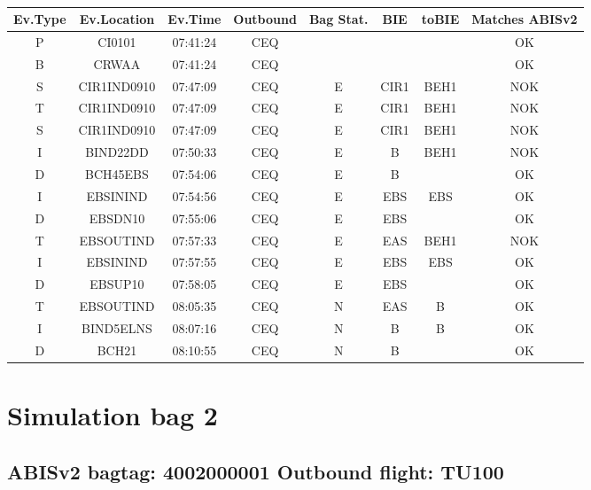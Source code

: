 \documentclass{report}
\begin{document}
\paragraph{}
\begin{longtable}{cccccccc}    \toprule
\rowcolor{white!50}
\textbf{Ev.Type} & \textbf{Ev.Location} & \textbf{Ev.Time} & \textbf{Outbound} & \textbf{Bag Stat.} & \textbf{BIE} & \textbf{toBIE} & \textbf{Matches ABISv2} \\\midrule
P & CI0101 & 07:41:24  & CEQ &  &  &  & OK\\
B & CRWAA & 07:41:24  & CEQ &  &  &  & OK\\
S & CIR1IND0910 & 07:47:09  & CEQ & E & CIR1 & BEH1 & NOK\\
T & CIR1IND0910 & 07:47:09  & CEQ & E & CIR1 & BEH1 & NOK\\
S & CIR1IND0910 & 07:47:09  & CEQ & E & CIR1 & BEH1 & NOK\\
I & BIND22DD & 07:50:33  & CEQ & E & B & BEH1 & NOK\\
D & BCH45EBS & 07:54:06  & CEQ & E & B &  & OK\\
I & EBSININD & 07:54:56  & CEQ & E & EBS & EBS & OK\\
D & EBSDN10 & 07:55:06  & CEQ & E & EBS &  & OK\\
T & EBSOUTIND & 07:57:33  & CEQ & E & EAS & BEH1 & NOK\\
I & EBSININD & 07:57:55  & CEQ & E & EBS & EBS & OK\\
D & EBSUP10 & 07:58:05  & CEQ & E & EBS &  & OK\\
T & EBSOUTIND & 08:05:35  & CEQ & N & EAS & B & OK\\
I & BIND5ELNS & 08:07:16  & CEQ & N & B & B & OK\\
D & BCH21 & 08:10:55  & CEQ & N & B &  & OK\\
\bottomrule
\end{longtable}
\pagebreak
\section*{Simulation bag 2}
\subsection*{ABISv2 bagtag: 4002000001 Outbound flight: TU100}
\end{document}
